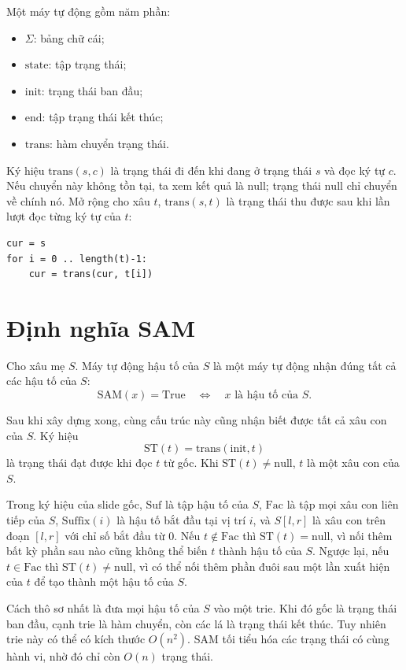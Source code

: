 \documentclass[11pt]{article}
\begin{document}
Một máy tự động gồm năm phần:
\begin{itemize}
  \item $\Sigma$: bảng chữ cái;
  \item $\mathrm{state}$: tập trạng thái;
  \item $\mathrm{init}$: trạng thái ban đầu;
  \item $\mathrm{end}$: tập trạng thái kết thúc;
  \item $\mathrm{trans}$: hàm chuyển trạng thái.
\end{itemize}

Ký hiệu $\mathrm{trans}(s,c)$ là trạng thái đi đến khi đang ở trạng thái $s$ và
đọc ký tự $c$.  Nếu chuyển này không tồn tại, ta xem kết quả là
$\mathrm{null}$; trạng thái $\mathrm{null}$ chỉ chuyển về chính nó.  Mở rộng
cho xâu $t$, $\mathrm{trans}(s,t)$ là trạng thái thu được sau khi lần lượt đọc
từng ký tự của $t$:
\begin{verbatim}
cur = s
for i = 0 .. length(t)-1:
    cur = trans(cur, t[i])
\end{verbatim}

\section{Định nghĩa SAM}

Cho xâu mẹ $S$.  Máy tự động hậu tố của $S$ là một máy tự động nhận đúng tất cả
các hậu tố của $S$:
\[
  \mathrm{SAM}(x)=\mathrm{True}
  \quad\Longleftrightarrow\quad
  x \text{ là hậu tố của } S.
\]

Sau khi xây dựng xong, cùng cấu trúc này cũng nhận biết được tất cả xâu con của
$S$.  Ký hiệu
\[
  \mathrm{ST}(t)=\mathrm{trans}(\mathrm{init},t)
\]
là trạng thái đạt được khi đọc $t$ từ gốc.  Khi $\mathrm{ST}(t)\ne
\mathrm{null}$, $t$ là một xâu con của $S$.

Trong ký hiệu của slide gốc, \(\mathrm{Suf}\) là tập hậu tố của \(S\),
\(\mathrm{Fac}\) là tập mọi xâu con liên tiếp của \(S\), \(\mathrm{Suffix}(i)\)
là hậu tố bắt đầu tại vị trí \(i\), và \(S[l,r]\) là xâu con trên đoạn
\([l,r]\) với chỉ số bắt đầu từ \(0\). Nếu \(t\notin\mathrm{Fac}\) thì
\(\mathrm{ST}(t)=\mathrm{null}\), vì nối thêm bất kỳ phần sau nào cũng không thể
biến \(t\) thành hậu tố của \(S\). Ngược lại, nếu \(t\in\mathrm{Fac}\) thì
\(\mathrm{ST}(t)\ne\mathrm{null}\), vì có thể nối thêm phần đuôi sau một lần
xuất hiện của \(t\) để tạo thành một hậu tố của \(S\).

Cách thô sơ nhất là đưa mọi hậu tố của $S$ vào một trie.  Khi đó gốc là trạng
thái ban đầu, cạnh trie là hàm chuyển, còn các lá là trạng thái kết thúc.  Tuy
nhiên trie này có thể có kích thước $O(n^2)$.  SAM tối tiểu hóa các trạng thái
có cùng hành vi, nhờ đó chỉ còn $O(n)$ trạng thái.
\end{document}
